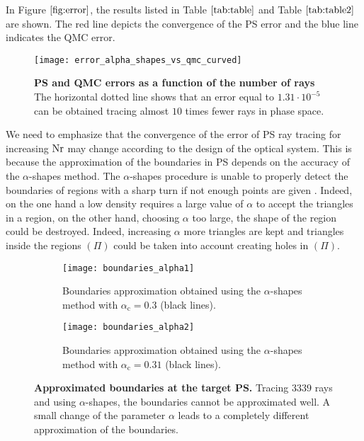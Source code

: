 \noindent In Figure $\ref{fig:error}$, the results listed in Table $\ref{tab:table}$ and Table $\ref{tab:table2}$ are shown. The red line depicts the convergence of the PS error and the blue line indicates the QMC error.
\begin{figure}[h]
  \begin{center}
  \texttt{[image: error\_alpha\_shapes\_vs\_qmc\_curved]}
  \end{center}
  \caption{\textbf{PS and QMC errors as a function of the number of rays}
  The horizontal dotted line shows that an error equal to $1.31\cdot  10^{-5}$ can be obtained tracing almost $10$ times fewer rays in phase space.}
  \label{fig:error}
\end{figure}
We need to emphasize that the convergence of the error of PS ray tracing for increasing $\textrm{Nr}$ may change according to the design of the optical system.
This is because the approximation of the boundaries in PS depends on the accuracy of the $\alpha$-shapes method.
The $\alpha$-shapes procedure is unable to properly detect the boundaries of regions with a sharp turn if not enough points are given
\cite{teichmann1998surface}. Indeed, on the one hand a low density requires a large value of $\alpha$ to accept the triangles in a region, on the other hand,
 choosing $\alpha$ too large, the shape of the region could be destroyed. Indeed, increasing $\alpha$ more triangles are kept and triangles inside the regions $(\Pi)$ could be taken into account creating holes in $(\Pi)$.
\begin{figure}[h]
\centering
\begin{subfigure}{.48\textwidth}
  \centering
  \texttt{[image: boundaries\_alpha1]}
  \caption{Boundaries approximation obtained using the $\alpha$-shapes method with $\alpha_\textrm{c} = 0.3$ (black lines).}
\end{subfigure}
\hfill
\begin{subfigure}{.48\textwidth}
  \centering
  \texttt{[image: boundaries\_alpha2]}
  \caption{Boundaries approximation obtained using the $\alpha$-shapes method with $\alpha_\textrm{c} = 0.31$ (black lines).}
\end{subfigure}
\caption{\textbf{Approximated boundaries at the target PS.} Tracing $3339$ rays and using $\alpha$-shapes, the boundaries cannot be approximated well. 
A small change of the parameter $\alpha$ leads to a completely different approximation of the boundaries.}
\label{fig:Tir1}
\end{figure}
